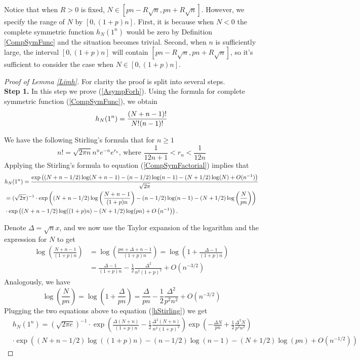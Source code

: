 \begin{remark}
	Notice that when $R>0$ is fixed, $N\in[pn-R\sqrt{n},pn+R\sqrt{n}]$. However, we specify the range of $N$ by $[0,(1+p)n]$. First, it is because when $N<0$ the complete symmetric function $h_{N}(1^{n})$ would be zero by Definition \ref{CompSymFunc} and the situation becomes trivial. Second, when $n$ is sufficiently large, the interval $[0,(1+p)n]$ will contain $[pn-R\sqrt{n},pn+R\sqrt{n}]$, so it's sufficient to consider the case when $N\in[0,(1+p)n]$.
\end{remark}
\begin{proof}[Proof of Lemma \ref{Limh}]
For clarity the proof is split into several steps.\\
\textbf{Step 1.} In this step we prove (\ref	{AsympForh}). Using the formula for complete symmetric function (\ref{CompSymFunc}), we obtain
\begin{align}{\label{CompSymFactorial}}
	h_{N}(1^n)=\frac{(N+n-1)!}{N!(n-1)!}
\end{align}

We have the following Stirling's formula \cite{stirling} that for $n\geq 1$
$$n!=\sqrt{2\pi n}n^ne^{-n}e^{r_{n}}\text{, where }\frac{1}{12n+1}<r_{n}<\frac{1}{12n}$$
Applying the Stirling's formula to equation (\ref{CompSymFactorial}) implies that
\begin{align}{\label{hStirling}}
\begin{split}
	& h_{N}(1^n)=\frac{\exp\left( (N+n-1/2)\log(N+n-1)-(n-1/2)\log(n-1)-(N+1/2)\log(N)+O(n^{-1}) \right)}{\sqrt{2\pi}}\\
	& = (\sqrt{2\pi})^{-1}\cdot \exp\left((N+n-1/2)\log\left(\frac{N+n-1}{(1+p)n}\right)-(n-1/2)\log(n-1)-(N+1/2)\log\left(\frac{N}{pn}\right)\right)\\
	&\cdot \exp\left((N+n-1/2)\log((1+p)n)-(N+1/2)\log(pn)+O\left(n^{-1}\right)\right).
\end{split}
\end{align}

Denote $\Delta=\sqrt{n}x$, and we now use the Taylor expansion of the logarithm and the expression for $N$ to get
\begin{align*}
	\log\left(\frac{N+n-1}{(1+p)n}\right)&=\log\left(\frac{pn+\Delta+n-1}{(1+p)n}\right)=\log\left(1+\frac{\Delta-1}{(1+p)n}\right)\\
	& = \frac{\Delta-1}{(1+p)n}-\frac{1}{2}\frac{\Delta^2}{n^2(1+p)^{2}}+O\left(n^{-3/2}\right)
\end{align*}
Analogously, we have $$\log\left(\frac{N}{pn}\right)=\log\left(1+\frac{\Delta}{pn}\right)=\frac{\Delta}{pn}-\frac{1}{2}\frac{\Delta^2}{p^2 n^2}+O\left(n^{-3/2}\right)$$
Plugging the two equations above to equation (\ref{hStirling}) we get
\begin{align*}
	& h_{N}(1^n)=(\sqrt{2\pi e})^{-1}\cdot \exp\left(\frac{\Delta(N+n)}{(1+p)n}-\frac{1}{2}\frac{\Delta^{2}(N+n)}{n^2(1+p)^2}\right)\exp\left(-\frac{\Delta N}{pn}+\frac{1}{2}\frac{\Delta^2 N}{p^2 n^2}\right)\\
	& \cdot \exp\left((N+n-1/2)\log((1+p)n)-(n-1/2)\log(n-1)-(N+1/2)\log(pn)+O(n^{-1/2})\right)
\end{align*}


\end{proof}
